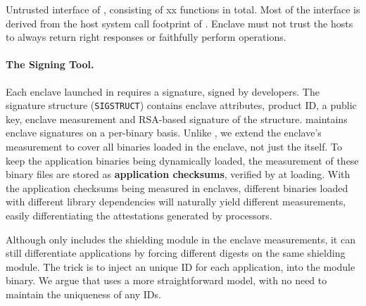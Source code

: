 
\begin{table}
\centering

\caption[\sysname{}: the untrusted interface.]
{Untrusted interface of \sysname{}, consisting of xx functions in total.
Most of the interface is derived from the host system call footprint of
\graphene{} \libos{}. Enclave must not trust the hosts to
always return right responses or faithfully perform operations.}
\label{tab:gsgx:untrusted-interface}
\end{table}

\paragraph{The Signing Tool.}
Each enclave launched in \sgx{} requires a signature, signed by developers.
The signature structure ({\tt SIGSTRUCT}) contains
enclave attributes, product ID, a public key, enclave measurement
and RSA-based signature of the structure.
\sysname{} maintains enclave signatures on a per-binary basis.
Unlike \haven{}, we extend the enclave's measurement to
cover all binaries loaded in the enclave, not just the \libos{} itself.
To keep the application binaries being dynamically loaded,
the measurement of these binary files are stored as
{\bf application checksums}, verified by \sysname{} at loading.
With the application checksums being measured in enclaves,
different binaries loaded with different library dependencies
will naturally yield different measurements,
easily differentiating the attestations generated by processors.

Although \haven{} only includes the shielding module
in the enclave measurements,
it can still differentiate applications by forcing different digests
on the same shielding module.
The trick is to inject an unique ID for each application,
into the module binary.
We argue that \sysname{} uses a more straightforward model, with no need to
maintain the uniqueness of any IDs.







